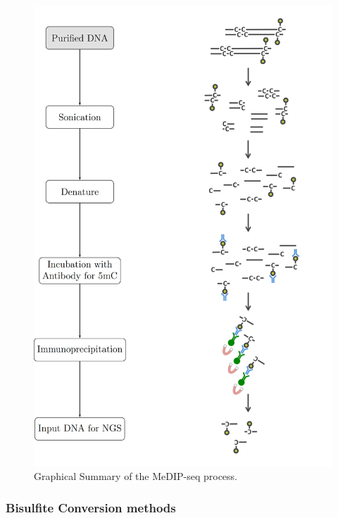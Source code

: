 \documentclass[
]{book}
\begin{document}
\begin{figure}

{\centering \includegraphics[width=1\linewidth]{figs/MeDIPseqReaction} 

}

\caption{Graphical Summary of the MeDIP-seq process.}\label{fig:MeDIPseqReaction}
\end{figure}



\hypertarget{bisulfite-conversion-methods}{%
\subsubsection{Bisulfite Conversion methods}\label{bisulfite-conversion-methods}}
\end{document}
